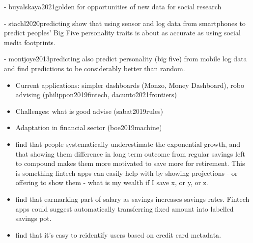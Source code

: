 - buyalskaya2021golden for opportunities of new data for social research

- stachl2020predicting show that using sensor and log data from smartphones to
predict peoples' Big Five personality traits is about as accurate as using
social media footprints.

- montjoye2013predicting also predict personality (big five) from mobile log
data and find predictions to be considerably better than random.



\begin{itemize}
    \item Current applications: simpler dashboards (Monzo, Money Dashboard),
        robo advising (philippon2019fintech, dacunto2021frontiers)

    \item Challenges: what is good advise (sabat2019rules)

    \item Adaptation in financial sector (boe2019machine)

    \item \citet{mckenzie2011misunderstanding} find that people systematically
        underestimate the exponential growth, and that showing them difference
        in long term outcome from regular savings left to compound makes them
        more motivated to save more for retirement. This is something fintech
        apps can easily help with by showing projections - or offering to show
        them - what is my wealth if I save x, or y, or z.

    \item \citet{soman2011earmarking} find that earmarking part of salary as
        savings increases savings rates. Fintech apps could suggest
        automatically transferring fixed amount into labelled savings pot.
\end{itemize}

\begin{itemize}
    \item \citet{demontjoye2015unique} find that it's easy to reidentify users
        based on credit card metadata.
\end{itemize}


